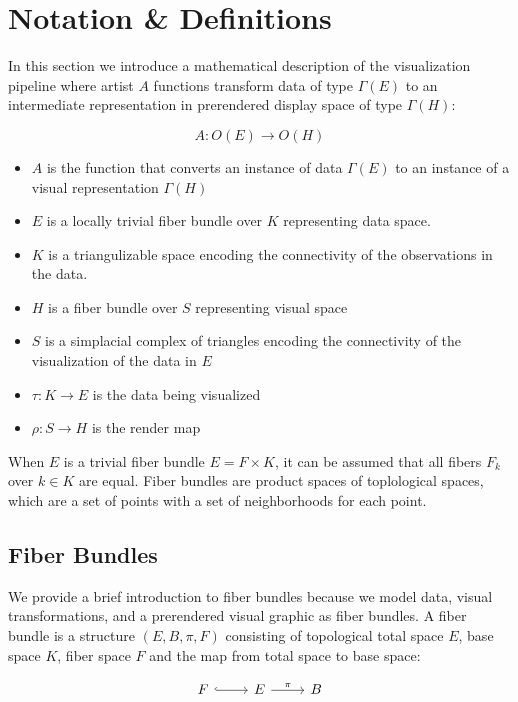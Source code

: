 \documentclass[../main.tex]{subfiles}
\begin{document}
\section{Notation \& Definitions}
In this section we introduce a mathematical description of the visualization pipeline where artist $A$ functions transform data of type $\Gamma(E)$ to an intermediate representation in prerendered display space of type $\Gamma(H)$:

\begin{equation}
    A: O(E) \rightarrow O(H)
    \label{eq:artist}
\end{equation}

\begin{itemize}
\item $A$ is the function that converts an instance of data $\Gamma(E)$ to an instance of a visual representation $\Gamma(H)$ 
\item $E$ is a locally trivial fiber bundle over $K$ representing data space.
\item $K$ is a triangulizable space encoding the connectivity of the observations in the data. 
\item $H$ is a fiber bundle over $S$ representing visual space
\item $S$ is a simplacial complex of triangles encoding the connectivity of the visualization of the data in $E$
\item $\tau: K\rightarrow E$ is the data being visualized
\item $\rho: S \rightarrow H$ is the render map
\end{itemize}

When $E$ is a trivial fiber bundle $E = F \times K$, it can be assumed that all fibers $F_{k}$ over $k \in K$ are equal. Fiber bundles are product spaces of toplological spaces, which are a set of points with a set of neighborhoods for each point\cite{FiberBundle2020, rowlandFiberBundle}.

\subsection{Fiber Bundles}
We provide a brief introduction to fiber bundles because we model data, visual transformations, and a prerendered visual graphic as fiber bundles. A fiber bundle is a structure $(E, B, \pi, F)$  consisting of topological total space $E$, base space $K$, fiber space $F$ and the map from total space to base space:

\begin{equation}
    \begin{tikzcd}
        F \arrow[r, hook] & E \arrow[r, "\pi"] & B
    \end{tikzcd}
\end{equation}
\end{document}
